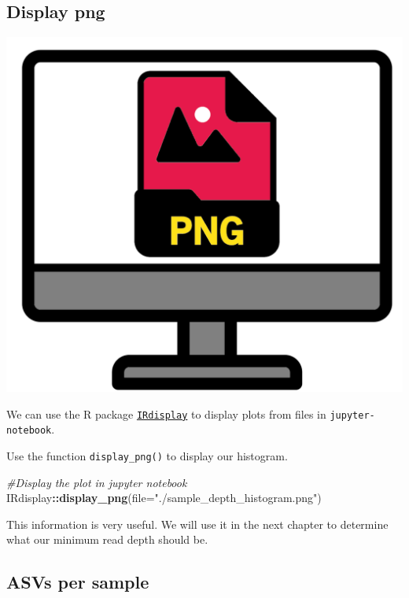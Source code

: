 \documentclass[
]{book}
\newenvironment{Shaded}{\begin{snugshade}}{\end{snugshade}}
\newcommand{\AttributeTok}[1]{\textcolor[rgb]{0.13,0.29,0.53}{#1}}
\newcommand{\CommentTok}[1]{\textcolor[rgb]{0.56,0.35,0.01}{\textit{#1}}}
\newcommand{\FunctionTok}[1]{\textcolor[rgb]{0.13,0.29,0.53}{\textbf{#1}}}
\newcommand{\NormalTok}[1]{#1}
\newcommand{\SpecialCharTok}[1]{\textcolor[rgb]{0.81,0.36,0.00}{\textbf{#1}}}
\newcommand{\StringTok}[1]{\textcolor[rgb]{0.31,0.60,0.02}{#1}}
\begin{document}
\hypertarget{display-png}{%
\subsection{Display png}\label{display-png}}

\includegraphics{figures/display_png.png}

We can use the R package \href{https://github.com/IRkernel/IRdisplay}{\texttt{IRdisplay}} to display plots from files in \texttt{jupyter-notebook}.

Use the function \texttt{display\_png()} to display our histogram.

\begin{Shaded}
\begin{Highlighting}[]
\CommentTok{\#Display the plot in jupyter notebook}
\NormalTok{IRdisplay}\SpecialCharTok{::}\FunctionTok{display\_png}\NormalTok{(}\AttributeTok{file=}\StringTok{"./sample\_depth\_histogram.png"}\NormalTok{)}
\end{Highlighting}
\end{Shaded}

This information is very useful. We will use it in the next chapter to determine what our minimum read depth should be.

\hypertarget{asvs-per-sample}{%
\subsection{ASVs per sample}\label{asvs-per-sample}}
\end{document}

